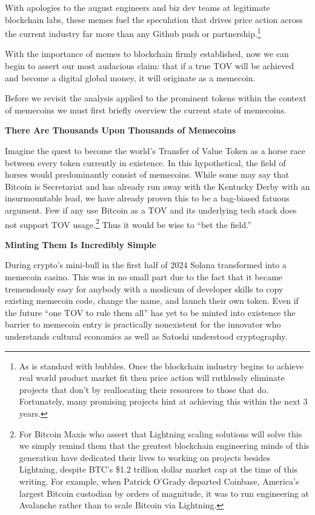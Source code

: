 \documentclass{article}
\begin{document}
With apologies to the august engineers and biz dev teams at legitimate blockchain labs, these memes fuel the speculation that drives price action across the current industry far more than any Github push or partnership.\footnote{As is standard with bubbles. Once the blockchain industry begins to achieve real world product market fit then price action will ruthlessly eliminate projects that don't by reallocating their resources to those that do. Fortunately, many promising projects hint at achieving this within the next 3 years.}

With the importance of memes to blockchain firmly established, now we can begin to assert our most audacious claim: that if a true TOV will be achieved and become a digital global money, it will originate as a memecoin.

Before we revisit the analysis applied to the prominent tokens within the context of memecoins we must first briefly overview the current state of memecoins.

\textbf{There Are Thousands Upon Thousands of Memecoins}

Imagine the quest to become the world's Transfer of Value Token as a horse race between every token currently in existence. In this hypothetical, the field of horses would predominantly consist of memecoins. While some may say that Bitcoin is Secretariat and has already run away with the Kentucky Derby with an insurmountable lead, we have already proven this to be a bag-biased fatuous argument. Few if any use Bitcoin as a TOV and its underlying tech stack does not support TOV usage.\footnote{For Bitcoin Maxis who assert that Lightning scaling solutions will solve this we simply remind them that the greatest blockchain engineering minds of this generation have dedicated their lives to working on projects besides Lightning, despite BTC's \$1.2 trillion dollar market cap at the time of this writing. For example, when Patrick O'Grady departed Coinbase, America's largest Bitcoin custodian by orders of magnitude, it was to run engineering at Avalanche rather than to scale Bitcoin via Lightning.} Thus it would be wise to ``bet the field.''

\textbf{Minting Them Is Incredibly Simple}

During crypto's mini-bull in the first half of 2024 Solana transformed into a memecoin casino. This was in no small part due to the fact that it became tremendously easy for anybody with a modicum of developer skills to copy existing memecoin code, change the name, and launch their own token. Even if the future ``one TOV to rule them all'' has yet to be minted into existence the barrier to memecoin entry is practically nonexistent for the innovator who understands cultural economics as well as Satoshi understood cryptography.
\end{document}
